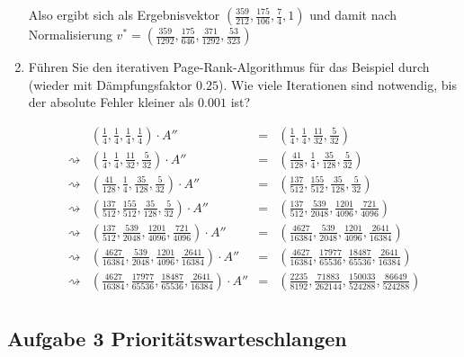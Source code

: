 \documentclass[11pt,a4paper,ngerman]{article}
\begin{document}
\begin{enumerate}[\bfseries a)]
Also ergibt sich als Ergebnisvektor $\left( \frac{359}{212}, \frac{175}{106}, \frac{7}{4}, 1 \right)$ und damit nach Normalisierung $v^{*} = \left( \frac{359}{1292}, \frac{175}{646}, \frac{371}{1292}, \frac{53}{323} \right) $
\item Führen Sie den iterativen Page-Rank-Algorithmus für das Beispiel durch (wieder mit Dämpfungsfaktor $0.25$). Wie viele Iterationen sind notwendig, bis der absolute Fehler kleiner als $0.001$ ist?

$$
\begin{array}{crcl}
\quad &
\left( \frac{1}{4}, \frac{1}{4}, \frac{1}{4}, \frac{1}{4} \right) \cdot A'' & = &
\left( \frac{1}{4}, \frac{1}{4}, \frac{11}{32}, \frac{5}{32} \right) \\
\rightsquigarrow &
\left( \frac{1}{4}, \frac{1}{4}, \frac{11}{32}, \frac{5}{32} \right) \cdot A'' & = &
\left( \frac{41}{128}, \frac{1}{4}, \frac{35}{128}, \frac{5}{32} \right) \\
\rightsquigarrow &
\left( \frac{41}{128}, \frac{1}{4}, \frac{35}{128}, \frac{5}{32} \right) \cdot A'' & = &
\left( \frac{137}{512}, \frac{155}{512}, \frac{35}{128}, \frac{5}{32} \right) \\
\rightsquigarrow &
\left( \frac{137}{512}, \frac{155}{512}, \frac{35}{128}, \frac{5}{32} \right) \cdot A'' & = &
\left( \frac{137}{512}, \frac{539}{2048}, \frac{1201}{4096}, \frac{721}{4096} \right) \\
\rightsquigarrow &
\left( \frac{137}{512}, \frac{539}{2048}, \frac{1201}{4096}, \frac{721}{4096} \right) \cdot A'' & = &
\left( \frac{4627}{16384}, \frac{539}{2048}, \frac{1201}{4096}, \frac{2641}{16384} \right) \\
\rightsquigarrow &
\left( \frac{4627}{16384}, \frac{539}{2048}, \frac{1201}{4096}, \frac{2641}{16384} \right) \cdot A'' & = &
\left( \frac{4627}{16384}, \frac{17977}{65536}, \frac{18487}{65536}, \frac{2641}{16384} \right) \\
\rightsquigarrow &
\left( \frac{4627}{16384}, \frac{17977}{65536}, \frac{18487}{65536}, \frac{2641}{16384} \right) \cdot A'' & = &
\left( \frac{2235}{8192}, \frac{71883}{262144}, \frac{150033}{524288}, \frac{86649}{524288} \right) \\
\end{array}
$$
\end{enumerate}

\subsection*{Aufgabe 3 \mdseries Prioritätswarteschlangen}
\end{document}
